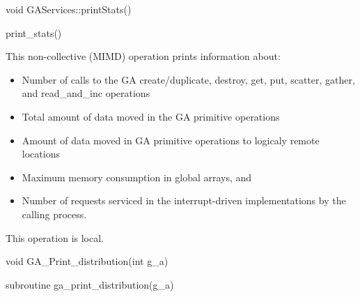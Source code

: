 \documentclass[12pt]{article}
\begin{document}
\begin{cxxapi}
\begin{cxxcode}
void GAServices::printStats()
\end{cxxcode}
\end{cxxapi}

\begin{pyapi}
\begin{pycode}
print_stats()  
\end{pycode}
\end{pyapi}

\begin{desc}

This non-collective (MIMD) operation prints information about:
\begin{itemize}
    \item Number of calls to the GA create/duplicate, destroy, get, 
     put, scatter, gather, and read_and_inc operations
    \item Total amount of data moved in the GA primitive operations
    \item Amount of data moved in GA primitive operations to logicaly 
     remote locations
    \item Maximum memory consumption in global arrays, and
    \item Number of requests serviced in the interrupt-driven implementations 
     by the calling process.
\end{itemize}

This operation is local.
\end{desc}


\begin{capi}
\begin{ccode}
void GA_Print_distribution(int g_a)
\end{ccode}
\begin{funcargs}
\end{funcargs}
\end{capi}

\begin{fapi}
\begin{fcode}
subroutine ga_print_distribution(g_a)   
\end{fcode}
\begin{funcargs}
\end{funcargs}
\end{fapi}
\end{document}
